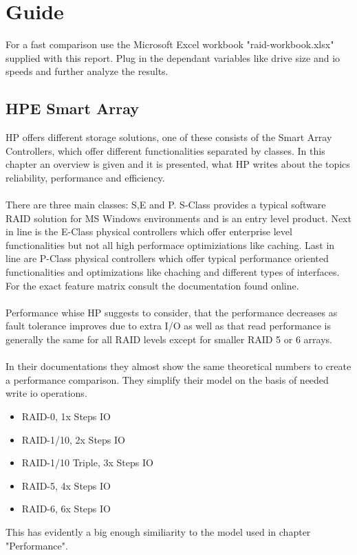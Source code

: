 \documentclass{article}
\begin{document}
\section{Guide}
For a fast comparison use the Microsoft Excel workbook "raid-workbook.xlsx"
supplied with this report. Plug in the dependant variables like drive size
and io speeds and further analyze the results.
\subsection{HPE Smart Array}
HP offers different storage solutions, one of
these consists of the Smart Array Controllers,
which offer different functionalities separated by classes.
In this chapter an overview is given and it is presented,
what HP writes about the topics reliability, performance and efficiency.
\\ \\
There are three main classes: S,E and P.
S-Class provides a typical software RAID solution for MS Windows
environments and is an entry level product.
Next in line is the E-Class physical controllers
which offer enterprise level functionalities but
not all high performace optimiziations like caching.
Last in line are P-Class physical controllers
which offer typical performance oriented functionalities and optimizations
like chaching and different types of interfaces.
For the exact feature matrix consult the documentation found online. \cite{hpe:sa-userguide}
\\ \\
Performance whise HP suggests to consider, 
that the performance decreases as fault tolerance improves due to extra I/O as well as that
read performance is generally the same for all RAID levels except for smaller RAID 5 or 6 arrays. \cite{hpe:sa-userguide}
\\ \\
In their documentations they almost show the same
theoretical numbers to create a performance comparison.
They simplify their model on the basis of needed write io operations.
\begin{itemize}
    \item RAID-0, 1x Steps IO 
    \item RAID-1/10, 2x Steps IO
    \item RAID-1/10 Triple, 3x Steps IO
    \item RAID-5, 4x Steps IO
    \item RAID-6, 6x Steps IO
\end{itemize}
This has evidently a big enough similiarity to the model used in chapter "Performance".
\end{document}
